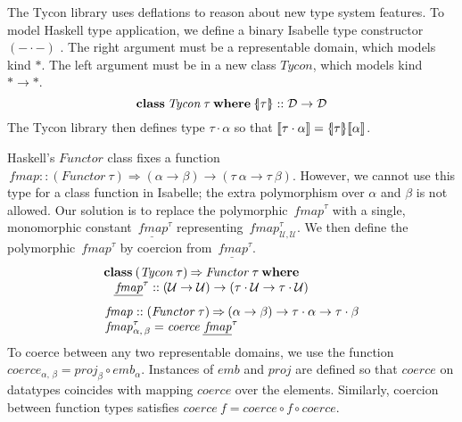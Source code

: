 \documentclass{sigplanconf}
\newcommand{\To}{\mathbin{\Rightarrow}}
\newcommand{\U}{\ensuremath{\mathcal{U}}}
\newcommand{\D}{\ensuremath{\mathcal{D}}}
\newcommand{\univ}[1]{\ensuremath{\underline{#1}}}
\newcommand{\REP}[1]{\ensuremath{\llbracket#1\rrbracket}}
\newcommand{\symlbrace}{\mathopen{\lbrace\mkern-4.5mu\mid}}
\newcommand{\symrbrace}{\mathclose{\mid\mkern-4.5mu\rbrace}}
\newcommand{\TC}[1]{\ensuremath{\symlbrace#1\symrbrace}}
\newcommand{\kwd}[1]{\mathbf{#1}}
\newcommand{\hsc}[1]{\ensuremath{\mathit{#1}}}
\newcommand{\hsemb}{\hsc{emb}}
\newcommand{\hsproj}{\hsc{proj}}
\newcommand{\hscoerce}{\hsc{coerce}}
\newcommand{\fmap}{\,\hsc{fmap}} %
\newcommand{\fmapU}{\univ{\fmap}}
\newcommand{\tA}{\alpha}
\newcommand{\tB}{\beta}
\newcommand{\tT}{\tau}
\theoremstyle{definition}
\begin{document}
The Tycon library \cite{AFP2012} uses deflations to reason about new type system features.
To model Haskell type application, we define a binary Isabelle type constructor $(-\cdot-)$ \cite{HMW2005}. The right argument must be a representable domain, which models kind $*$. The left argument must be in a new class \hsc{Tycon}, which models kind $*\to*$.
%
\begin{equation*}
\kwd{class}\:\hsc{Tycon}\:\tT\:\kwd{where}\:\TC{\tT} :: \D \to \D
\end{equation*}
%
The Tycon library then defines type $\tT\cdot\tA$ %
so that $\REP{\tT\cdot\tA} = \TC{\tT}\REP{\tA}$.


Haskell's \hsc{Functor} class fixes a function $\fmap :: (\hsc{Functor}\:\tT) \To (\tA \to \tB) \to (\tT\:\tA \to \tT\:\tB)$. However, we cannot use this type for a class function in Isabelle; the extra polymorphism over $\tA$ and $\tB$ is not allowed.
Our solution is to replace the polymorphic $\fmap^\tT$ with a single, monomorphic constant $\fmapU^\tT$ representing $\fmap^\tT_{\U,\U}$. %
We then define the polymorphic $\fmap^\tT$ by coercion from $\fmapU^\tT$.
%
\begin{align*}
  & \kwd{class}\:(\hsc{Tycon}\:\tT) \To \hsc{Functor}\:\tT\:\kwd{where}
  \\[-\jot]
  & \hspace{8pt} \fmapU^\tT :: (\U \to \U) \to (\tT\cdot\U \to \tT\cdot\U)
  \\[\jot]
  & \fmap :: (\hsc{Functor}\:\tT) \To (\tA \to \tB) \to \tT\cdot\tA \to \tT\cdot\tB
  \\[-\jot]
  & \fmap^\tT_{\tA,\,\tB} = \hscoerce\:\fmapU^\tT
\end{align*}
%
To coerce between any two representable domains, we use the function $\hscoerce_{\tA,\,\tB} = \hsproj_\tB \circ \hsemb_\tA$. Instances of \hsc{emb} and \hsc{proj} are defined so that $\hscoerce$ on datatypes coincides with mapping $\hscoerce$ over the elements. Similarly, coercion between function types satisfies $\hscoerce\:f = \hscoerce \circ f \circ \hscoerce$.
\end{document}
